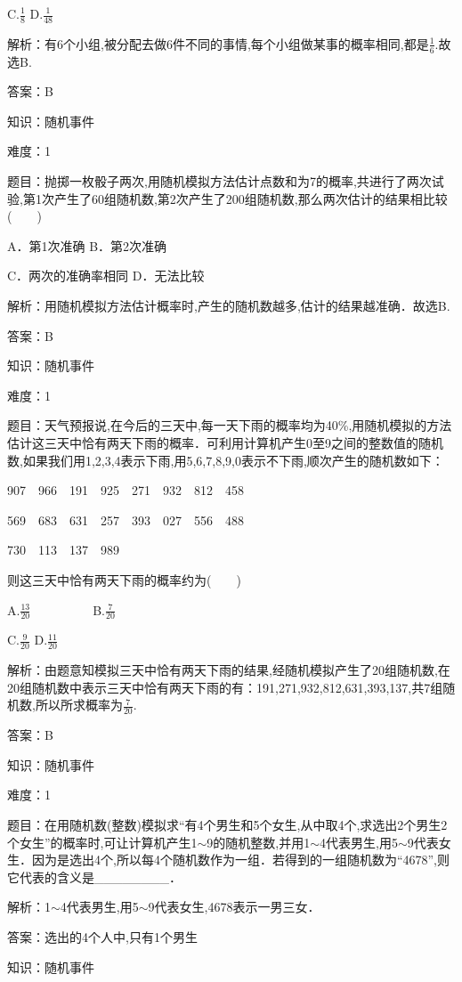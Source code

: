 \documentclass{article} %
\begin{document}
C.$\frac{1}{8}$     D.$\frac{1}{48}$

解析：有6个小组,被分配去做6件不同的事情,每个小组做某事的概率相同,都是$\frac{1}{6}$.故选B.

答案：B

知识：随机事件

难度：1

题目：抛掷一枚骰子两次,用随机模拟方法估计点数和为7的概率,共进行了两次试验,第1次产生了60组随机数,第2次产生了200组随机数,那么两次估计的结果相比较(　　)

A．第1次准确  B．第2次准确

C．两次的准确率相同  D．无法比较

解析：用随机模拟方法估计概率时,产生的随机数越多,估计的结果越准确．故选B.

答案：B

知识：随机事件

难度：1

题目：天气预报说,在今后的三天中,每一天下雨的概率均为40\%,用随机模拟的方法估计这三天中恰有两天下雨的概率．可利用计算机产生0至9之间的整数值的随机数,如果我们用1,2,3,4表示下雨,用5,6,7,8,9,0表示不下雨,顺次产生的随机数如下：

907　966　191　925　271　932　812　458

569　683　631　257　393　027　556　488

730　113　137　989

则这三天中恰有两天下雨的概率约为(　　)

A.$\frac{13}{20}$　　　　　B.$\frac{7}{20}$

C.$\frac{9}{20}$     D.$\frac{11}{20}$

解析：由题意知模拟三天中恰有两天下雨的结果,经随机模拟产生了20组随机数,在20组随机数中表示三天中恰有两天下雨的有：191,271,932,812,631,393,137,共7组随机数,所以所求概率为$\frac{7}{20}$.

答案：B

知识：随机事件

难度：1

题目：在用随机数(整数)模拟求``有4个男生和5个女生,从中取4个,求选出2个男生2个女生''的概率时,可让计算机产生1$\sim$9的随机整数,并用1$\sim$4代表男生,用5$\sim$9代表女生．因为是选出4个,所以每4个随机数作为一组．若得到的一组随机数为``4678'',则它代表的含义是\_\_\_\_\_\_\_\_．

解析：1$\sim$4代表男生,用5$\sim$9代表女生,4678表示一男三女．

答案：选出的4个人中,只有1个男生

知识：随机事件
\end{document}
